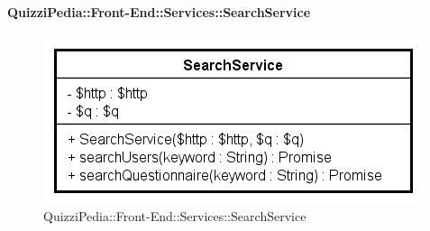 \paragraph{QuizziPedia::Front-End::Services::SearchService}
\begin{figure}[ht]
	\centering
	\includegraphics[scale=0.80]{UML/Classi/Front-End/QuizziPedia_Front-end_Services_SearchService.png}
	\caption{QuizziPedia::Front-End::Services::SearchService}
\end{figure}\FloatBarrier
